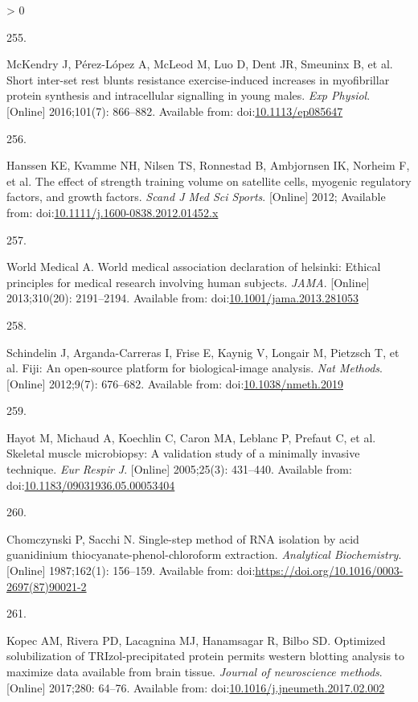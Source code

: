 \documentclass[twoside,10pt]{gihclass} %
\newlength{\cslhangindent}
\newlength{\csllabelwidth}
\newenvironment{CSLReferences}[3] %
 {%
  \setlength{\parindent}{0pt}
  \ifodd #1 \everypar{\setlength{\hangindent}{\cslhangindent}}\ignorespaces\fi
  \ifnum #2 > 0
  \setlength{\parskip}{#2\baselineskip}
  \fi
 }%
 {}
\newcommand{\CSLLeftMargin}[1]{\parbox[t]{\maxof{\widthof{#1}}{\csllabelwidth}}{#1}}
\newcommand{\CSLRightInline}[1]{\parbox[t]{\linewidth}{#1}}
\begin{document}
\begin{CSLReferences}{0}{0}
\leavevmode\hypertarget{ref-RN2857}{}%
\CSLLeftMargin{255. }
\CSLRightInline{McKendry J, Pérez-López A, McLeod M, Luo D, Dent JR, Smeuninx B, et al. Short inter-set rest blunts resistance exercise-induced increases in myofibrillar protein synthesis and intracellular signalling in young males. \emph{Exp Physiol}. {[}Online{]} 2016;101(7): 866--882. Available from: doi:\href{https://doi.org/10.1113/ep085647}{10.1113/ep085647}}

\leavevmode\hypertarget{ref-RN796}{}%
\CSLLeftMargin{256. }
\CSLRightInline{Hanssen KE, Kvamme NH, Nilsen TS, Ronnestad B, Ambjornsen IK, Norheim F, et al. The effect of strength training volume on satellite cells, myogenic regulatory factors, and growth factors. \emph{Scand J Med Sci Sports}. {[}Online{]} 2012; Available from: doi:\href{https://doi.org/10.1111/j.1600-0838.2012.01452.x}{10.1111/j.1600-0838.2012.01452.x}}

\leavevmode\hypertarget{ref-RN1590}{}%
\CSLLeftMargin{257. }
\CSLRightInline{World Medical A. World medical association declaration of helsinki: Ethical principles for medical research involving human subjects. \emph{JAMA}. {[}Online{]} 2013;310(20): 2191--2194. Available from: doi:\href{https://doi.org/10.1001/jama.2013.281053}{10.1001/jama.2013.281053}}

\leavevmode\hypertarget{ref-RN2561}{}%
\CSLLeftMargin{258. }
\CSLRightInline{Schindelin J, Arganda-Carreras I, Frise E, Kaynig V, Longair M, Pietzsch T, et al. Fiji: An open-source platform for biological-image analysis. \emph{Nat Methods}. {[}Online{]} 2012;9(7): 676--682. Available from: doi:\href{https://doi.org/10.1038/nmeth.2019}{10.1038/nmeth.2019}}

\leavevmode\hypertarget{ref-RN824}{}%
\CSLLeftMargin{259. }
\CSLRightInline{Hayot M, Michaud A, Koechlin C, Caron MA, Leblanc P, Prefaut C, et al. Skeletal muscle microbiopsy: A validation study of a minimally invasive technique. \emph{Eur Respir J}. {[}Online{]} 2005;25(3): 431--440. Available from: doi:\href{https://doi.org/10.1183/09031936.05.00053404}{10.1183/09031936.05.00053404}}

\leavevmode\hypertarget{ref-RN2672}{}%
\CSLLeftMargin{260. }
\CSLRightInline{Chomczynski P, Sacchi N. Single-step method of RNA isolation by acid guanidinium thiocyanate-phenol-chloroform extraction. \emph{Analytical Biochemistry}. {[}Online{]} 1987;162(1): 156--159. Available from: doi:\url{https://doi.org/10.1016/0003-2697(87)90021-2}}

\leavevmode\hypertarget{ref-RN2050}{}%
\CSLLeftMargin{261. }
\CSLRightInline{Kopec AM, Rivera PD, Lacagnina MJ, Hanamsagar R, Bilbo SD. Optimized solubilization of TRIzol-precipitated protein permits western blotting analysis to maximize data available from brain tissue. \emph{Journal of neuroscience methods}. {[}Online{]} 2017;280: 64--76. Available from: doi:\href{https://doi.org/10.1016/j.jneumeth.2017.02.002}{10.1016/j.jneumeth.2017.02.002}}


\end{CSLReferences}
\end{document}
